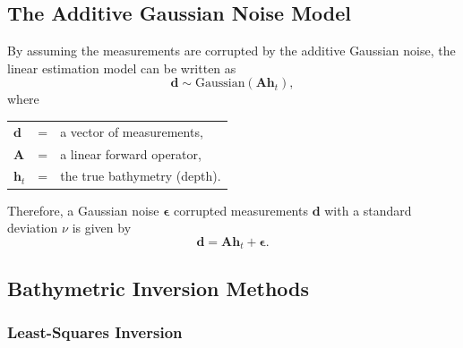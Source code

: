 \subsection{The Additive Gaussian Noise Model} \label{Gaussian_noise}
By assuming the measurements are corrupted by the additive Gaussian noise, the linear estimation model can be written as 
\begin{equation}
\mathbf{d} \sim \text{Gaussian}( \mathbf{A} \mathbf{h}_t),
\end{equation}
\vspace{0.3cm}
where\\
\begin{tabular}{l c l}
$\mathbf{d}$ &=& a vector of measurements,\\
$\mathbf{A}$ &=& a linear forward operator,\\
$\mathbf{h}_t$ &=& the true bathymetry (depth). 
\end{tabular}

\vspace{0.3cm}
\noindent Therefore, a Gaussian noise $\boldsymbol{\epsilon}$ corrupted measurements $\mathbf{d}$ with a standard deviation  $\nu$ is given by 
$$
\mathbf{d} = \mathbf{A} \mathbf{h}_t + \boldsymbol{\epsilon}.
$$



\subsection{Bathymetric Inversion Methods}\label{inv_techniques}

\subsubsection{Least-Squares Inversion}

